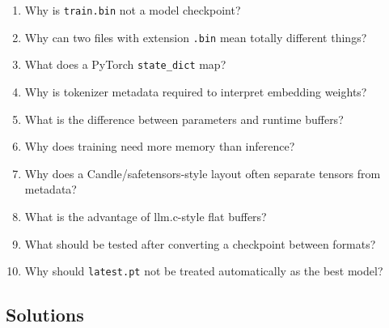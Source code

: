 \checkpoint

\begin{enumerate}
  \item Why is \texttt{train.bin} not a model checkpoint?
  \item Why can two files with extension \texttt{.bin} mean totally different things?
  \item What does a PyTorch \texttt{state\_dict} map?
  \item Why is tokenizer metadata required to interpret embedding weights?
  \item What is the difference between parameters and runtime buffers?
  \item Why does training need more memory than inference?
  \item Why does a Candle/safetensors-style layout often separate tensors from metadata?
  \item What is the advantage of llm.c-style flat buffers?
  \item What should be tested after converting a checkpoint between formats?
  \item Why should \texttt{latest.pt} not be treated automatically as the best model?
\end{enumerate}

\subsection*{Solutions}

